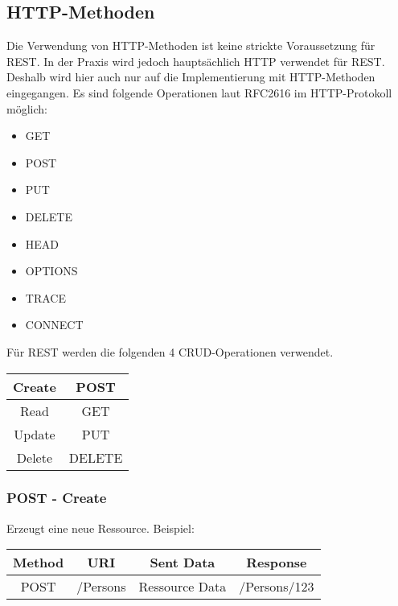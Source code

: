 \documentclass[listof=totoc]{article}
\begin{document}
	\subsection{\ac{HTTP}-Methoden}
	Die Verwendung von \ac{HTTP}-Methoden ist keine strickte Voraussetzung für REST.
	In der Praxis wird jedoch hauptsächlich \ac{HTTP} verwendet für REST. Deshalb wird hier auch nur auf die Implementierung mit \ac{HTTP}-Methoden eingegangen.
	\newline \newline
	Es sind folgende Operationen laut RFC2616\cite{RFC2616} im \ac{HTTP}-Protokoll möglich:
	\begin{itemize} 
		\setlength{\itemsep}{0pt} 
		\item GET
		\item POST
		\item PUT
		\item DELETE
		\item HEAD
		\item OPTIONS
		\item TRACE
		\item CONNECT
	\end{itemize}
	\begin{center}
	Für \ac{REST} werden die folgenden 4 \ac{CRUD}-Operationen verwendet. 
	\newline \newline
	\begin{tabular}{|c|c|}
		\hline 
		Create & POST \\ 
		\hline 
		Read & GET \\ 
		\hline 
		Update & PUT \\ 
		\hline 
		Delete & DELETE \\ 
		\hline 
	\end{tabular} 
	\end{center}
	\newpage
	\subsubsection{POST - Create}
	Erzeugt eine neue Ressource.
	\newline \newline
	Beispiel:
	\begin{tabular}{|c|c|c|c|}
		\hline 
		Method & URI & Sent Data & Response \\ 
		\hline 
		POST & /Persons & Ressource Data & /Persons/123 \\ 
		\hline 
	\end{tabular} 
	\newline
\end{document}
